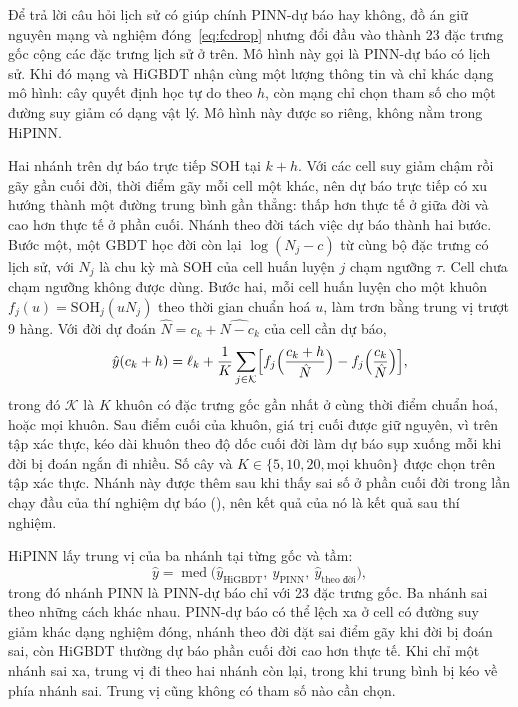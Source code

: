 Để trả lời câu hỏi lịch sử có giúp chính PINN-dự báo hay không, đồ án giữ nguyên mạng và nghiệm đóng~\eqref{eq:fcdrop}
nhưng đổi đầu vào thành 23 đặc trưng gốc cộng các đặc trưng lịch sử ở trên. Mô hình này gọi là PINN-dự báo có lịch sử.
Khi đó mạng và HiGBDT nhận cùng một lượng thông tin và chỉ khác dạng mô hình: cây quyết định học tự do theo $h$, còn mạng
chỉ chọn tham số cho một đường suy giảm có dạng vật lý. Mô hình này được so riêng, không nằm trong HiPINN.

Hai nhánh trên dự báo trực tiếp SOH tại $k+h$. Với các cell suy giảm chậm rồi gãy gần cuối đời, thời điểm gãy mỗi cell
một khác, nên dự báo trực tiếp có xu hướng thành một đường trung bình gần thẳng: thấp hơn thực tế ở giữa đời và cao hơn
thực tế ở phần cuối. Nhánh theo đời tách việc dự báo thành hai bước. Bước một, một GBDT học đời còn lại $\log(N_j - c)$
từ cùng bộ đặc trưng có lịch sử, với $N_j$ là chu kỳ mà SOH của cell huấn luyện $j$ chạm ngưỡng $\tau$. Cell chưa chạm
ngưỡng không được dùng. Bước hai, mỗi cell huấn luyện cho một khuôn $f_j(u) = \text{SOH}_j(u N_j)$ theo thời gian chuẩn
hoá $u$, làm trơn bằng trung vị trượt 9 hàng. Với đời dự đoán $\hat N = c_k + \widehat{N - c_k}$ của cell cần dự báo,
\begin{equation}\label{eq:life}
\hat y(c_k + h) = \ell_k + \frac{1}{K}\sum_{j \in \mathcal{K}}
  \Bigl[f_j\Bigl(\frac{c_k + h}{\hat N}\Bigr) - f_j\Bigl(\frac{c_k}{\hat N}\Bigr)\Bigr],
\end{equation}
trong đó $\mathcal{K}$ là $K$ khuôn có đặc trưng gốc gần nhất ở cùng thời điểm chuẩn hoá, hoặc mọi khuôn. Sau điểm cuối
của khuôn, giá trị cuối được giữ nguyên, vì trên tập xác thực, kéo dài khuôn theo độ dốc cuối đời làm dự báo sụp xuống mỗi
khi đời bị đoán ngắn đi nhiều. Số cây và $K \in \{5, 10, 20, \text{mọi khuôn}\}$ được chọn trên tập xác thực. Nhánh này
được thêm sau khi thấy sai số ở phần cuối đời trong lần chạy đầu của thí nghiệm dự báo (), nên kết quả
của nó là kết quả sau thí nghiệm.

HiPINN lấy trung vị của ba nhánh tại từng gốc và tầm:
\begin{equation}\label{eq:e33}
\hat y = \operatorname{med}\bigl(\hat y_\text{HiGBDT},\ \hat y_\text{PINN},\ \hat y_\text{theo đời}\bigr),
\end{equation}
trong đó nhánh PINN là PINN-dự báo chỉ với 23 đặc trưng gốc. Ba nhánh sai theo những cách khác nhau. PINN-dự báo có thể
lệch xa ở cell có đường suy giảm khác dạng nghiệm đóng, nhánh theo đời đặt sai điểm gãy khi đời bị đoán sai, còn HiGBDT
thường dự báo phần cuối đời cao hơn thực tế. Khi chỉ một nhánh sai xa, trung vị đi theo hai nhánh còn lại, trong khi trung
bình bị kéo về phía nhánh sai. Trung vị cũng không có tham số nào cần chọn.

